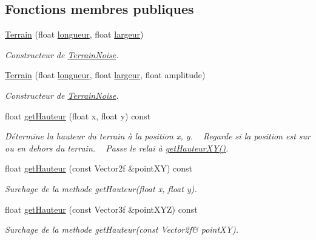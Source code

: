 \subsection*{Fonctions membres publiques}
\begin{DoxyCompactItemize}
\item 
\hyperlink{class_terrain_acebfe49e26563a8c2ca49e44a74fb40f}{Terrain} (float \hyperlink{class_terrain_ae25fe0ac0800f0e1c57c9b33f38f5a37}{longueur}, float \hyperlink{class_terrain_a1153a4642fd691e7fe25f9af1faba132}{largeur})
\begin{DoxyCompactList}\small\item\em Constructeur de \hyperlink{class_terrain_noise}{Terrain\+Noise}. \end{DoxyCompactList}\item 
\hyperlink{class_terrain_aeae81c7f546cae03d468363b558f5beb}{Terrain} (float \hyperlink{class_terrain_ae25fe0ac0800f0e1c57c9b33f38f5a37}{longueur}, float \hyperlink{class_terrain_a1153a4642fd691e7fe25f9af1faba132}{largeur}, float amplitude)
\begin{DoxyCompactList}\small\item\em Constructeur de \hyperlink{class_terrain_noise}{Terrain\+Noise}. \end{DoxyCompactList}\item 
float \hyperlink{class_terrain_a8892842d80a9737a1aabd9505a0fb49f}{get\+Hauteur} (float x, float y) const 
\begin{DoxyCompactList}\small\item\em Détermine la hauteur du terrain à la position {\itshape x}, {\itshape y}. ~\newline
Regarde si la position est sur ou en dehors du terrain. ~\newline
Passe le relai à \hyperlink{class_terrain_a63c855275f8270ccc0203bde0776a08f}{get\+Hauteur\+X\+Y()}. \end{DoxyCompactList}\item 
float \hyperlink{class_terrain_aadd802c62f67a5cfbbf820d31b45f87c}{get\+Hauteur} (const Vector2f \&point\+X\+Y) const 
\begin{DoxyCompactList}\small\item\em Surchage de la methode get\+Hauteur(float x, float y). \end{DoxyCompactList}\item 
float \hyperlink{class_terrain_a53105ed5f4b2dceadf432b52c7dbb5a3}{get\+Hauteur} (const Vector3f \&point\+X\+Y\+Z) const 
\begin{DoxyCompactList}\small\item\em Surchage de la methode get\+Hauteur(const Vector2f\& point\+X\+Y). \end{DoxyCompactList}\item 

\end{DoxyCompactItemize}
